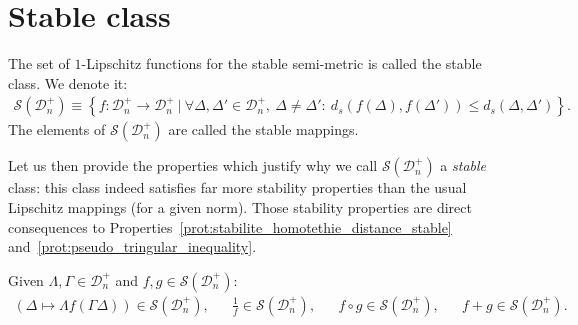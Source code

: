 \documentclass[a4papaer, titlepage]{book}
\begin{document}
\section{Stable class}
\begin{definition}\label{def:classe_des_fonctions_stables}
  The set of $1$-Lipschitz functions for the stable semi-metric is called the stable class. We denote it:
  \begin{align*}
    \mathcal S \left(\mathcal D_n^+\right) \equiv \left\{ f : \mathcal D_n^+ \rightarrow \mathcal D_n^+ \ | \ \forall \Delta,\Delta' \in \mathcal D_n^+,  \ \Delta \neq \Delta': \ d_s(f(\Delta),f(\Delta')) \leq d_s (\Delta,\Delta')\right\}.
  \end{align*}
  The elements of $\mathcal S \left(\mathcal D_n^+\right) $ are called the stable mappings. 
\end{definition}

Let us then provide the properties which justify why we call $\mathcal S \left(\mathcal D_n^+\right)$ a \textit{stable} class: this class indeed satisfies far more stability properties than the usual Lipschitz mappings (for a given norm). Those stability properties are direct consequences to Properties~\ref{prot:stabilite_homotethie_distance_stable} and~\ref{prot:pseudo_tringular_inequality}.
\begin{property}\label{prot:stabilite_contr_mapping_mat_diagonales}
  Given $\Lambda, \Gamma\in \mathcal D_n^+$ and $f,g \in \mathcal S(\mathcal D_n^+)$:
  \begin{align*}
    \left( \Delta \mapsto \Lambda f(\Gamma \Delta) \right)\in \mathcal S(\mathcal D_n^+),&
    &\frac{1}{f}\in \mathcal S(\mathcal D_n^+),&
    &f \circ g\in \mathcal S(\mathcal D_n^+),&
    &f +g\in \mathcal S(\mathcal D_n^+).
  \end{align*}
\end{property}
\end{document}

